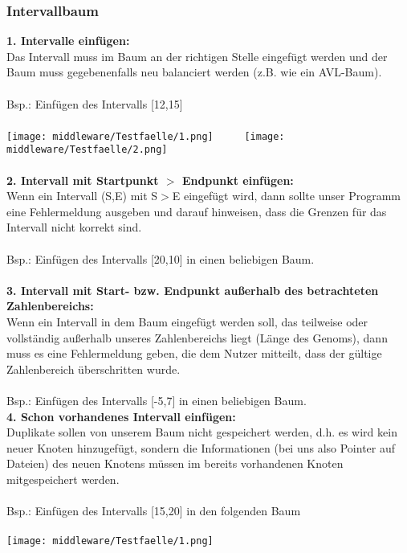 \documentclass{scrartcl}
\begin{document}
\subsubsection{Intervallbaum}
\textbf{1. Intervalle einfügen:}\\
Das Intervall muss im Baum an der richtigen Stelle eingefügt werden und der Baum muss gegebenenfalls neu balanciert werden (z.B. wie ein AVL-Baum).\\\\
Bsp.: Einfügen des Intervalls [12,15]\\\\
\texttt{[image: middleware/Testfaelle/1.png]}$~~~~~~~~~~~$
\texttt{[image: middleware/Testfaelle/2.png]}\\\\
\textbf{2. Intervall mit Startpunkt $>$ Endpunkt einfügen:}\\
Wenn ein Intervall (S,E) mit S$>$E eingefügt wird, dann sollte unser Programm eine Fehlermeldung ausgeben und darauf hinweisen, dass die Grenzen für das Intervall nicht korrekt sind.\\\\
Bsp.: Einfügen des Intervalls [20,10] in einen beliebigen Baum.\\\\
\textbf{3. Intervall mit Start- bzw. Endpunkt außerhalb des betrachteten Zahlenbereichs:}\\
Wenn ein Intervall in dem Baum eingefügt werden soll, das teilweise oder vollständig außerhalb unseres Zahlenbereichs liegt (Länge des Genoms), dann muss es eine Fehlermeldung geben, die dem Nutzer mitteilt, dass der gültige Zahlenbereich überschritten wurde.\\\\
Bsp.: Einfügen des Intervalls [-5,7] in einen beliebigen Baum.\newpage\hfill\\
\textbf{4. Schon vorhandenes Intervall einfügen:}\\
Duplikate sollen von unserem Baum nicht gespeichert werden, d.h. es wird kein neuer Knoten hinzugefügt, sondern die Informationen (bei uns also Pointer auf Dateien) des neuen Knotens müssen im bereits vorhandenen Knoten mitgespeichert werden.\\\\
Bsp.: Einfügen des Intervalls [15,20] in den folgenden Baum\\\\
\texttt{[image: middleware/Testfaelle/1.png]}\\
\end{document}
